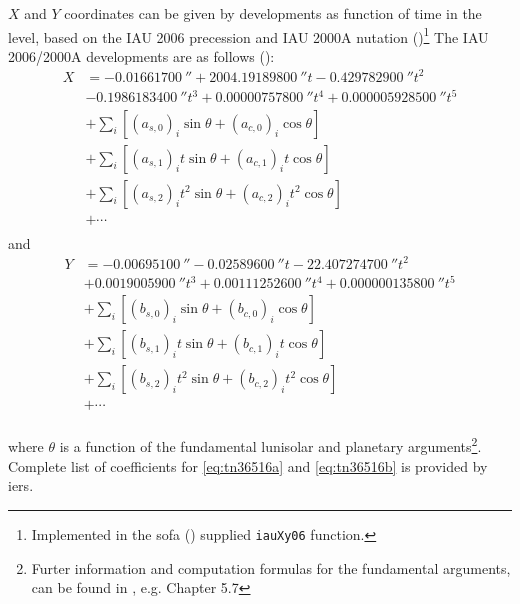 $X$ and $Y$ coordinates can be given by developments as function of time in the 
\si{\micro\larcsecond} level, based on the IAU 2006 precession and IAU 2000A
nutation (\cite{CapitaineAndWallace2006})\footnote{Implemented in the \gls{sofa} (\cite{SOFA20210125}) supplied \texttt{iauXy06} function.}
The IAU 2006/2000A developments are as follows (\cite{iers2010}):
\begin{equation}
  \label{eq:tn36516a}
  \begin{aligned}
  X &= \SI{-0.01661700}{\arcsecond} + \SI{2004.19189800}{\arcsecond} t - \SI{0.429782900}{\arcsecond} t^2 \\
  &- \SI{0.1986183400}{\arcsecond}t^3 + \SI{0.00000757800}{\arcsecond} t^4 + \SI{0.000005928500}{\arcsecond} t^5 \\
  &+ \sum_{i} \left[ (a_{s,0})_i \sin \theta + (a_{c,0})_i \cos \theta \right] \\ 
  &+ \sum_{i} \left[ (a_{s,1})_i t \sin \theta + (a_{c,1})_i t \cos \theta \right] \\ 
  &+ \sum_{i} \left[ (a_{s,2})_i t^2 \sin \theta + (a_{c,2})_i t^2 \cos \theta \right] \\ 
  &+ \cdots \\
  \end{aligned}
\end{equation}
and
\begin{equation}
  \label{eq:tn36516b}
  \begin{aligned}
  Y &= -\SI{0.00695100}{\arcsecond} - \SI{0.02589600}{\arcsecond} t - \SI{22.407274700}{\arcsecond} t^2 \\
  &+ \SI{0.0019005900}{\arcsecond} t^3 + \SI{0.00111252600}{\arcsecond} t^4 + \SI{0.000000135800}{\arcsecond} t^5 \\
  &+ \sum_{i} \left[ (b_{s,0})_i \sin \theta     + (b_{c,0})_i \cos \theta \right] \\ 
  &+ \sum_{i} \left[ (b_{s,1})_i t \sin \theta   + (b_{c,1})_i t \cos \theta \right] \\ 
  &+ \sum_{i} \left[ (b_{s,2})_i t^2 \sin \theta + (b_{c,2})_i t^2 \cos \theta \right] \\ 
  &+ \cdots \\
  \end{aligned}
\end{equation}

where $\theta$ is a function of the fundamental lunisolar and planetary arguments\footnote{Furter information and computation formulas for the fundamental arguments, can be found in \cite{iers2010}, e.g. Chapter 5.7}. Complete 
list of coefficients for \ref{eq:tn36516a} and \ref{eq:tn36516b} is provided 
by \gls{iers}. 

